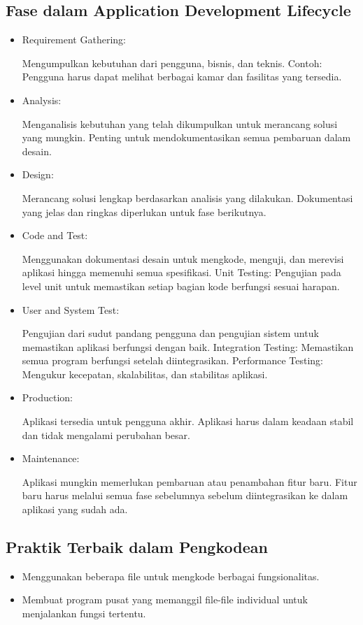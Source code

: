 \documentclass{article}
\begin{document}
\subsection{Fase dalam Application Development Lifecycle}
\begin{itemize}
    \item Requirement Gathering:

          Mengumpulkan kebutuhan dari pengguna, bisnis, dan teknis.
          Contoh: Pengguna harus dapat melihat berbagai kamar dan fasilitas yang tersedia.
    \item Analysis:

          Menganalisis kebutuhan yang telah dikumpulkan untuk merancang solusi yang mungkin.
          Penting untuk mendokumentasikan semua pembaruan dalam desain.
    \item Design:

          Merancang solusi lengkap berdasarkan analisis yang dilakukan.
          Dokumentasi yang jelas dan ringkas diperlukan untuk fase berikutnya.
    \item Code and Test:

          Menggunakan dokumentasi desain untuk mengkode, menguji, dan merevisi aplikasi hingga memenuhi semua spesifikasi.
          Unit Testing: Pengujian pada level unit untuk memastikan setiap bagian kode berfungsi sesuai harapan.
    \item User and System Test:

          Pengujian dari sudut pandang pengguna dan pengujian sistem untuk memastikan aplikasi berfungsi dengan baik.
          Integration Testing: Memastikan semua program berfungsi setelah diintegrasikan.
          Performance Testing: Mengukur kecepatan, skalabilitas, dan stabilitas aplikasi.
    \item Production:

          Aplikasi tersedia untuk pengguna akhir.
          Aplikasi harus dalam keadaan stabil dan tidak mengalami perubahan besar.
    \item Maintenance:

          Aplikasi mungkin memerlukan pembaruan atau penambahan fitur baru.
          Fitur baru harus melalui semua fase sebelumnya sebelum diintegrasikan ke dalam aplikasi yang sudah ada.
\end{itemize}

\subsection{Praktik Terbaik dalam Pengkodean}
\begin{itemize}
    \item Menggunakan beberapa file untuk mengkode berbagai fungsionalitas.
    \item Membuat program pusat yang memanggil file-file individual untuk menjalankan fungsi tertentu.
\end{itemize}
\end{document}
